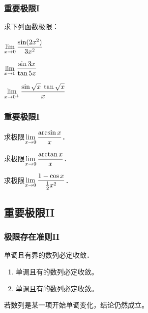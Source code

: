 \documentclass[14pt,notheorems,leqno,xcolor={rgb}]{beamer} %
\begin{document}
\begin{iframe}
\frametitle{重要极限I}
\begin{exercise}
求下列函数极限：
\begin{enumlite}
  \item $\lim\limits_{x\to0}\dfrac{\sin(2x^2)}{3x^2}$
  \item $\lim\limits_{x\to0}\dfrac{\sin 3x}{\tan 5x}$
  \item $\lim\limits_{x\to0^+}\dfrac{\sin\sqrt{x}\;\tan\sqrt{x}}{x}$
\end{enumlite}
\end{exercise}
\end{iframe}

\begin{frame}
\frametitle{重要极限I}
\begin{example}
求极限$\lim\limits_{x\to0}\dfrac{\arcsin x}{x}$．
\end{example}
\begin{example}
求极限$\lim\limits_{x\to0}\dfrac{\arctan x}{x}$．
\end{example}\pause
\begin{example}
求极限$\lim\limits_{x\to0}\dfrac{1-\cos x}{\frac12x^2}$．
\end{example}
\end{frame}

\subsection{重要极限II}

\begin{frame}
\frametitle{极限存在准则II}
\begin{theorem*}[极限存在准则II]
单调且有界的数列必定收敛．\pause\unskip
\begin{enumerate}
  \item 单调且有的数列必定收敛。
  \item 单调且有的数列必定收敛。
\end{enumerate}
\end{theorem*}
\vpause
\begin{remark*}
若数列是某一项开始单调变化，结论仍然成立。
\end{remark*}
\end{frame}
\end{document}
